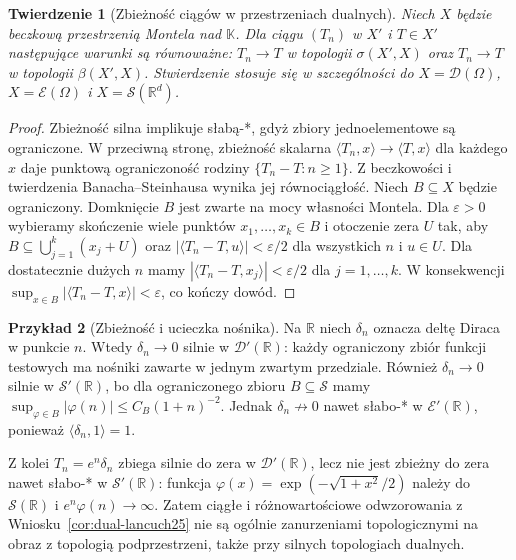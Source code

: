 \documentclass[11pt,a4paper]{article}
\numberwithin{equation}{section}
\theoremstyle{plain}
\newtheorem{twierdzenie}{Twierdzenie}[section]
\theoremstyle{definition}
\newtheorem{przyklad}[twierdzenie]{Przykład}
\theoremstyle{remark}
\newcommand{\R}{\mathbb R}
\newcommand{\K}{\mathbb K}
\begin{document}
\begin{twierdzenie}[Zbieżność ciągów w przestrzeniach dualnych]
\label{thm:weak-strong-sequences25}
Niech $X$ będzie beczkową przestrzenią Montela nad $\K$.
Dla ciągu $(T_n)$ w $X'$ i $T\in X'$ następujące
warunki są równoważne: $T_n\to T$ w topologii
$\sigma(X',X)$ oraz $T_n\to T$ w topologii $\beta(X',X)$.
Stwierdzenie stosuje się w szczególności do
$X=\mathcal D(\Omega)$, $X=\mathcal E(\Omega)$ i
$X=\mathcal S(\R^d)$.
\end{twierdzenie}
\begin{proof}
Zbieżność silna implikuje słabą-*, gdyż zbiory
jednoelementowe są ograniczone. W przeciwną stronę,
zbieżność skalarna $\langle T_n,x\rangle\to\langle T,x\rangle$
dla każdego $x$ daje punktową ograniczoność rodziny
$\{T_n-T:n\ge1\}$. Z beczkowości i twierdzenia
Banacha--Steinhausa wynika jej równociągłość. Niech
$B\subseteq X$ będzie ograniczony. Domknięcie $B$ jest
zwarte na mocy własności Montela. Dla $\varepsilon>0$
wybieramy skończenie wiele punktów $x_1,\ldots,x_k\in B$
i otoczenie zera $U$ tak, aby $B\subseteq\bigcup_{j=1}^k(x_j+U)$
oraz $|\langle T_n-T,u\rangle|<\varepsilon/2$
dla wszystkich $n$ i $u\in U$. Dla dostatecznie dużych $n$
mamy $|\langle T_n-T,x_j\rangle|<\varepsilon/2$
dla $j=1,\ldots,k$. W konsekwencji
$\sup_{x\in B}|\langle T_n-T,x\rangle|<\varepsilon$,
co kończy dowód.
\end{proof}

\begin{przyklad}[Zbieżność i ucieczka nośnika]
\label{ex:escaping-deltas25}
Na $\R$ niech $\delta_n$ oznacza deltę Diraca w punkcie
$n$. Wtedy $\delta_n\to0$ silnie w $\mathcal D'(\R)$:
każdy ograniczony zbiór funkcji testowych ma nośniki
zawarte w jednym zwartym przedziale. Również
$\delta_n\to0$ silnie w $\mathcal S'(\R)$, bo dla
ograniczonego zbioru $B\subseteq\mathcal S$ mamy
$\sup_{\varphi\in B}|\varphi(n)|\le C_B(1+n)^{-2}$.
Jednak $\delta_n\not\to0$ nawet słabo-* w
$\mathcal E'(\R)$, ponieważ $\langle\delta_n,1\rangle=1$.

Z kolei $T_n=e^n\delta_n$ zbiega silnie do zera w
$\mathcal D'(\R)$, lecz nie jest zbieżny do zera nawet
słabo-* w $\mathcal S'(\R)$: funkcja
$\varphi(x)=\exp(-\sqrt{1+x^2}/2)$ należy do
$\mathcal S(\R)$ i $e^n\varphi(n)\to\infty$.
Zatem ciągłe i różnowartościowe odwzorowania z
Wniosku~\ref{cor:dual-lancuch25} nie są ogólnie
zanurzeniami topologicznymi na obraz z topologią
podprzestrzeni, także przy silnych topologiach dualnych.
\end{przyklad}
\end{document}
